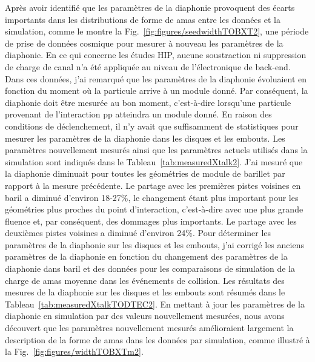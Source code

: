 Après avoir identifié que les paramètres de la diaphonie provoquent des écarts importants dans les distributions de forme de amas entre les données et la simulation, comme le montre la Fig.~\ref{fig:figures/seedwidthTOBXT2}, une période de prise de données cosmique pour mesurer à nouveau les paramètres de la diaphonie. En ce qui concerne les études HIP, aucune soustraction ni suppression de charge de canal n’a été appliquée au niveau de l’électronique de back-end. Dans ces données, j'ai remarqué que les paramètres de la diaphonie évoluaient en fonction du moment où la particule arrive à un module donné. Par conséquent, la diaphonie doit être mesurée au bon moment, c'est-à-dire lorsqu'une particule provenant de l'interaction pp atteindra un module donné. En raison des conditions de déclenchement, il n'y avait que suffisamment de statistiques pour mesurer les paramètres de la diaphonie dans les disques et les embouts. Les paramètres nouvellement mesurés ainsi que les paramètres actuels utilisés dans la simulation sont indiqués dans le Tableau~\ref{tab:measuredXtalk2}. J'ai mesuré que la diaphonie diminuait pour toutes les géométries de module de barillet par rapport à la mesure précédente. Le partage avec les premières pistes voisines en baril a diminué d'environ 18-27\%, le changement étant plus important pour les géométries plus proches du point d'interaction, c'est-à-dire avec une plus grande fluence et, par conséquent, des dommages plus importants. Le partage avec les deuxièmes pistes voisines a diminué d'environ 24\%. Pour déterminer les paramètres de la diaphonie sur les disques et les embouts, j'ai corrigé les anciens paramètres de la diaphonie en fonction du changement des paramètres de la diaphonie dans baril et des données pour les comparaisons de simulation de la charge de amas moyenne dans les événements de collision. Les résultats des mesures de la diaphonie sur les disques et les embouts sont résumés dans le Tableau~\ref{tab:measuredXtalkTODTEC2}. En mettant à jour les paramètres de la diaphonie en simulation par des valeurs nouvellement mesurées, nous avons découvert que les paramètres nouvellement mesurés amélioraient largement la description de la forme de amas dans les données par simulation, comme illustré à la Fig.~\ref{fig:figures/widthTOBXTm2}.

